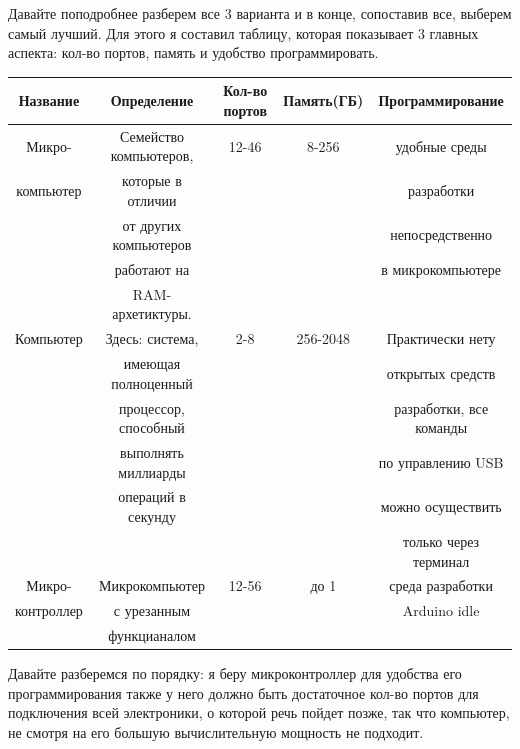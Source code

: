 \documentclass[a4paper, 12pt]{article}
\begin{document}
Давайте поподробнее разберем все 3 варианта и в конце, сопоставив все, выберем
самый лучший. Для этого я составил таблицу, которая показывает 3 главных
аспекта: кол-во портов, память и удобство программировать.
\begin{center}
  \begin{small}
    \begin{tabular}{ |c|c|c|c|c|}
      \hline
      Название   & Определение            & Кол-во портов & Память(ГБ) & Программирование        \\ \hline

      Микро-     & Семейство компьютеров, & 12-46         & 8-256      & удобные среды           \\
      компьютер  & которые в отличии      &               &            & разработки              \\
                 & от других компьютеров  &               &            & непосредственно         \\
                 & работают на            &               &            & в микрокомпьютере       \\
                 & RAM-архетиктуры.       &               &            &                         \\ \hline

      Компьютер  & Здесь: система,        & 2-8           & 256-2048   & Практически нету        \\
                 & имеющая полноценный    &               &            & открытых средств        \\
                 & процессор, способный   &               &            & разработки, все команды \\
                 & выполнять миллиарды    &               &            & по управлению USB       \\
                 & операций в секунду     &               &            & можно осуществить       \\
                 &                        &               &            & только через терминал   \\\hline

      Микро-     & Микрокомпьютер         & 12-56         & до 1       & среда разработки        \\
      контроллер & с урезанным            &               &            & Arduino idle            \\
                 & функцианалом           &               &            &                         \\
      \hline
    \end{tabular}
  \end{small}
\end{center}
Давайте разберемся по порядку: я беру микроконтроллер для удобства его
программирования также у него должно быть достаточное кол-во портов для
подключения всей электроники, о которой речь пойдет позже, так что компьютер,
не смотря на его большую вычислительную мощность не подходит.
\end{document}
